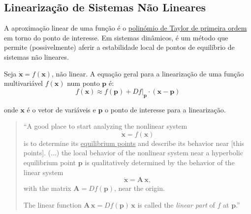 \subsection[2.1 Linearização de Sistemas Não Lineares]{\hspace*{0.075 em}\raisebox{0.2 em}{$\pmb{\drsh}$} Linearização de Sistemas Não Lineares}
\label{sec:linearisation}

\noindent A aproximação linear de uma função é o \underline{polinómio de Taylor de primeira ordem} em torno do ponto de interesse. Em sistemas dinâmicos, é um método que permite (possivelmente) aferir a estabilidade local de pontos de equilíbrio de sistemas não lineares.

{

\begin{mdframed}
    \noindent Seja $\pmb{\dot{x}} = f(\pmb{x})$, não linear. A equação geral para a linearização de uma função multivariável $f(\pmb{x})$ num ponto $\pmb{p}$ é:
    \vspace{-0.5em}
    $$
        f(\pmb{x}) \approx f(\pmb{p}) + \left.D f\right|_{\pmb{p}} \cdot (\pmb{x} - \pmb{p})
    $$
    
    \noindent onde $\pmb{x}$ é o vetor de variáveis e $\pmb{p}$ o ponto de interesse para a linearização.
\end{mdframed}
}

\begin{quote}
    \noindent ``A good place to start analyzing the nonlinear system 
    $$
        \pmb{\dot{x}} = f(\pmb{x}) 
    $$
    is to determine its \underline{equilibrium points} and describe its behavior near [this points]. (...) the local behavior of the nonlinear system near a hyperbolic equilibrium point $\pmb{p}$ is qualitatively determined by the behavior of the linear system
    $$
        \pmb{\dot{x}} = \pmb{A}\,\pmb{x},
    $$
    with the matrix $\pmb{A} = Df(\pmb{p})$, near the origin. 
    
    The linear function $\pmb{A}\, \pmb{x} = Df(\pmb{p})\, \pmb{x}$ is called the \textit{linear part} of $f$ at $\pmb{p}$.''\cite{Perko2013}
\end{quote}

